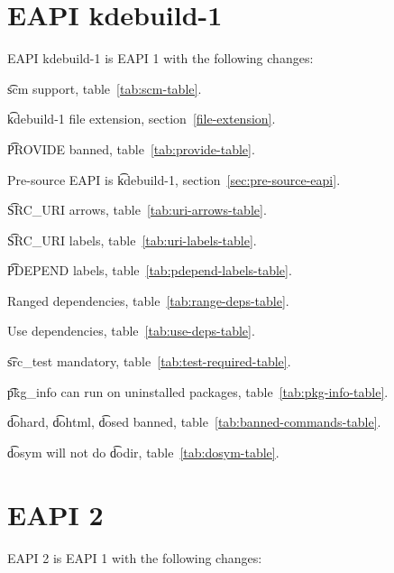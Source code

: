 \IFKDEBUILDELSE
{
    \section*{EAPI kdebuild-1}

    EAPI kdebuild-1 is EAPI 1 with the following changes:

    \begin{compactitem}
    \item \t{scm} support, table~\ref{tab:scm-table}.
    \item \t{kdebuild-1} file extension, section~\ref{file-extension}.
    \item \t{PROVIDE} banned, table~\ref{tab:provide-table}.
    \item Pre-source EAPI is \t{kdebuild-1}, section~\ref{sec:pre-source-eapi}.
    \item \t{SRC\_URI} arrows, table~\ref{tab:uri-arrows-table}.
    \item \t{SRC\_URI} labels, table~\ref{tab:uri-labels-table}.
    \item \t{PDEPEND} labels, table~\ref{tab:pdepend-labels-table}.
    \item Ranged dependencies, table~\ref{tab:range-deps-table}.
    \item Use dependencies, table~\ref{tab:use-deps-table}.
    \item \t{src\_test} mandatory, table~\ref{tab:test-required-table}.
    \item \t{pkg\_info} can run on uninstalled packages, table~\ref{tab:pkg-info-table}.
    \item \t{dohard}, \t{dohtml}, \t{dosed} banned, table~\ref{tab:banned-commands-table}.
    \item \t{dosym} will not do \t{dodir}, table~\ref{tab:dosym-table}.
    \end{compactitem}
}{
}

\section*{EAPI 2}

EAPI 2 is EAPI 1 with the following changes:


